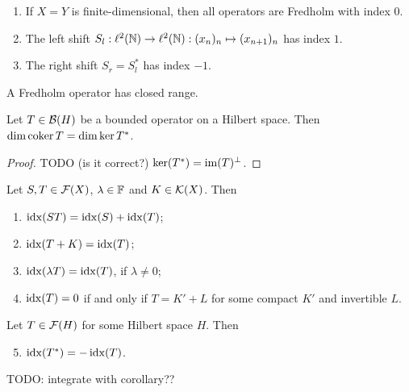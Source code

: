 \begin{example}
\begin{enumerate}
\item If $X=Y$ is finite-dimensional, then all operators are Fredholm with index $0$.
\item The left shift $S_l:\ell^2(\mathbb{N})\to\ell^2(\mathbb{N}): (x_n)_n\mapsto (x_{n+1})_n$ has index $1$.
\item The right shift $S_r = S_l^*$ has index $-1$.
\end{enumerate}
\end{example}

\begin{lemma}
A Fredholm operator has closed range.
\end{lemma}

\begin{lemma}
Let $T\in\operatorname{\mathcal{B}}(H)$ be a bounded operator on a Hilbert space. Then $\dim\operatorname{coker} T = \dim\ker T^*$.
\end{lemma}
\begin{proof}
TODO (is it correct?) $\ker(T^*) = \operatorname{im}(T)^\perp$.
\end{proof}


\begin{proposition}
Let $S,T\in\operatorname{\mathcal{F}}(X)$, $\lambda\in\mathbb{F}$ and $K\in\operatorname{\mathcal{K}}(X)$. Then
\begin{enumerate}
\item $\operatorname{idx}(ST) = \operatorname{idx}(S)+\operatorname{idx}(T)$;
\item $\operatorname{idx}(T+K) = \operatorname{idx}(T)$;
\item $\operatorname{idx}(\lambda T) = \operatorname{idx}(T)$, if $\lambda \neq 0$;
\item $\operatorname{idx}(T) = 0$ \textup{if and only if} $T=K'+L$ for some compact $K'$ and invertible $L$.
\end{enumerate}
Let $T\in\operatorname{\mathcal{F}}(H)$ for some Hilbert space $H$. Then
\begin{enumerate} \setcounter{enumi}{4}
\item $\operatorname{idx}(T^*) = -\operatorname{idx}(T)$.
\end{enumerate}
\end{proposition}
TODO: integrate with corollary??

